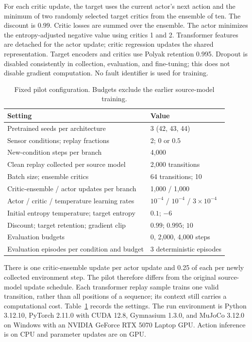 \documentclass[runningheads]{llncs}
\begin{document}
For each critic update, the target uses the current actor's next action and the minimum of two randomly selected target critics from the ensemble of ten. The discount is 0.99. Critic losses are summed over the ensemble. The actor minimizes the entropy-adjusted negative value using critics 1 and 2. Transformer features are detached for the actor update; critic regression updates the shared representation. Target encoders and critics use Polyak retention 0.995. Dropout is disabled consistently in collection, evaluation, and fine-tuning; this does not disable gradient computation. No fault identifier is used for training.

\begin{table}[t]
\caption{Fixed pilot configuration. Budgets exclude the earlier source-model training.}
\label{tab:config}
\centering\small
\begin{tabular}{@{}p{}p{}@{}}
\toprule
Setting & Value \\
\midrule
Pretrained seeds per architecture & 3 (42, 43, 44) \\
Sensor conditions; replay fractions & 2; $0$ or $0.5$ \\
New-condition steps per branch & 4,000 \\
Clean replay collected per source model & 2,000 transitions \\
Batch size; ensemble critics & 64 transitions; 10 \\
Critic-ensemble / actor updates per branch & 1,000 / 1,000 \\
Actor / critic / temperature learning rates & $10^{-4}$ / $10^{-4}$ / $3\!\times\!10^{-4}$ \\
Initial entropy temperature; target entropy & $0.1$; $-6$ \\
Discount; target retention; gradient clip & $0.99$; $0.995$; $10$ \\
Evaluation budgets & 0, 2,000, 4,000 steps \\
Evaluation episodes per condition and budget & 3 deterministic episodes \\
\bottomrule
\end{tabular}
\end{table}

There is one critic-ensemble update per actor update and 0.25 of each per newly collected environment step. The pilot therefore differs from the original source-model update schedule. Each transformer replay sample trains one valid transition, rather than all positions of a sequence; its context still carries a computational cost. Table~\ref{tab:config} records the settings. The run environment is Python 3.12.10, PyTorch 2.11.0 with CUDA 12.8, Gymnasium 1.3.0, and MuJoCo 3.12.0 on Windows with an NVIDIA GeForce RTX 5070 Laptop GPU. Action inference is on CPU and parameter updates are on GPU.
\end{document}
